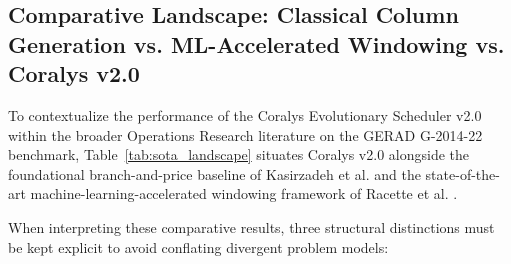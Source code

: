 \documentclass[journal]{IEEEtran}
\begin{document}
\subsection{Comparative Landscape: Classical Column Generation vs. ML-Accelerated Windowing vs. Coralys v2.0}

To contextualize the performance of the Coralys Evolutionary Scheduler v2.0 within the broader Operations Research literature on the GERAD G-2014-22 benchmark, Table~\ref{tab:sota_landscape} situates Coralys v2.0 alongside the foundational branch-and-price baseline of Kasirzadeh et al. \cite{kasirzadeh2017} and the state-of-the-art machine-learning-accelerated windowing framework of Racette et al. \cite{racette2025}. 

When interpreting these comparative results, three structural distinctions must be kept explicit to avoid conflating divergent problem models:
\end{document}
